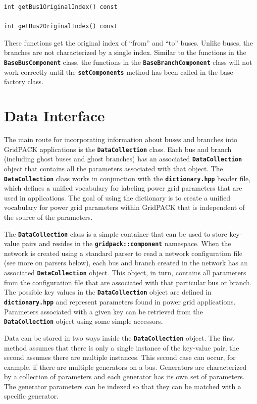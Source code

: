 \documentclass[12pt]{report} %
\begin{document}
{
\color{red}
\begin{Verbatim}[fontseries=b]
int getBus1OriginalIndex() const

int getBus2OriginalIndex() const
\end{Verbatim}
}

These functions get the original index of ``from'' and ``to'' buses. Unlike buses, the branches are not characterized by a single index. Similar to the functions in the \texttt{\textbf{BaseBusComponent}} class, the functions in the \texttt{\textbf{BaseBranchComponent}} class will not work correctly until the \texttt{\textbf{setComponents}} method has been called in the base factory class.

\section{Data Interface}

The main route for incorporating information about buses and branches into GridPACK applications is the \texttt{\textbf{DataCollection}} class. Each bus and branch (including ghost buses and ghost branches) has an associated \texttt{\textbf{DataCollection}} object that contains all the parameters associated with that object. The \texttt{\textbf{DataCollection}} class works in conjunction with the \texttt{\textbf{dictionary.hpp}} header file, which defines a unified vocabulary for labeling power grid parameters that are used in applications. The goal of using the dictionary is to create a unified vocabulary for power grid parameters within GridPACK that is independent of the source of the parameters.

The \texttt{\textbf{DataCollection}} class is a simple container that can be used to store key-value pairs and resides in the \texttt{\textbf{gridpack::component}} namespace. When the network is created using a standard parser to read a network configuration file (see more on parsers below), each bus and branch created in the network has an associated \texttt{\textbf{DataCollection}} object. This object, in turn, contains all parameters from the configuration file that are associated with that particular bus or branch. The possible key values in the \texttt{\textbf{DataCollection}} object are defined in \texttt{\textbf{dictionary.hpp}} and represent parameters found in power grid applications. Parameters associated with a given key can be retrieved from the \texttt{\textbf{DataCollection}} object using some simple accessors.

Data can be stored in two ways inside the \texttt{\textbf{DataCollection}} object. The first method assumes that there is only a single instance of the key-value pair, the second assumes there are multiple instances. This second case can occur, for example, if there are multiple generators on a bus. Generators are characterized by a collection of parameters and each generator has its own set of parameters. The generator parameters can be indexed so that they can be matched with a specific generator.
\end{document}
